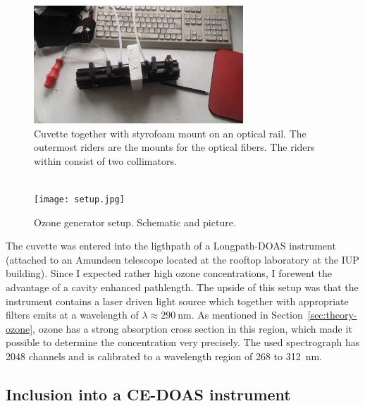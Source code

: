\begin{figure}[htbp]
  \centering
  \includegraphics[width=0.7\textwidth]{images/cuvette.jpg}
  \caption{Cuvette together with styrofoam mount on an optical
    rail. The outermost riders are the mounts for the optical
    fibers. The riders within consist of two collimators.}
  \label{fig:cuvette}
\end{figure}

\begin{figure}[htbp]
  \centering
  {
  \def\svgwidth{0.9\linewidth}
  
  }
  \phantom{h}\\
  \vspace{2cm}
  \texttt{[image: setup.jpg]}
  \caption{Ozone generator setup. Schematic and picture.}
  \label{fig:setup}
\end{figure}

The cuvette was entered into the ligthpath of a Longpath-DOAS
instrument (attached to an Amundsen telescope located at the rooftop
laboratory at the IUP building). Since I expected rather high ozone
concentrations, I forewent the advantage of a cavity enhanced
pathlength. The upside of this setup was that the instrument contains
a laser driven light source which together with appropriate filters
emits at a wavelength of $\lambda \approx \SI{290}{\nano\meter}$. As
mentioned in Section~\ref{sec:theory-ozone}, ozone has a strong
absorption cross section in this region, which made it possible to
determine the concentration very precisely. The used spectrograph has
2048 channels and is calibrated to a wavelength region of \num{268} to
\SI{312}{\nano\meter}.

\subsection{Inclusion into a CE-DOAS instrument}
\label{sec:inclusion}

